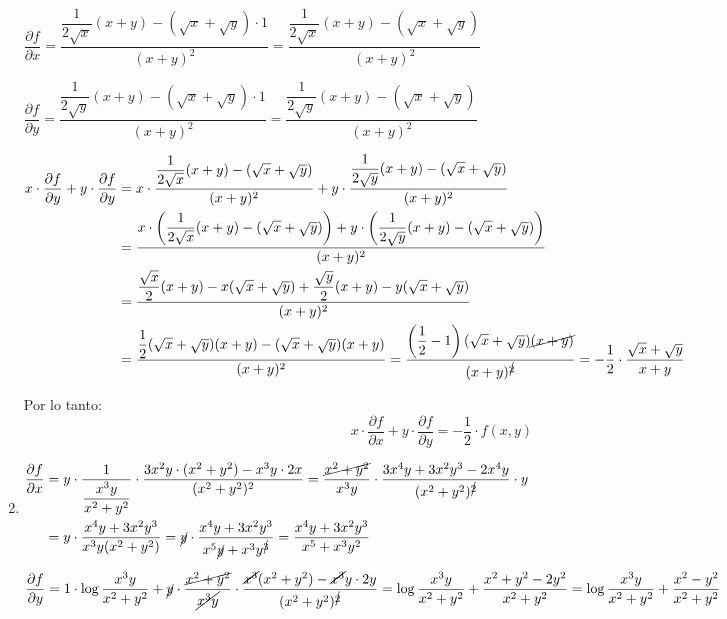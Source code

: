 \begin{enumerate}[label=\c olor{red}\textbf{\arabic*)}, leftmargin=*]
$\dfrac{\partial f}{\partial x}=\dfrac{\dfrac{1}{2\sqrt{x}}(x+y)-(\sqrt{x}+\sqrt{y})\cdot1}{(x+y)^{2}}=\dfrac{\dfrac{1}{2\sqrt{x}}(x+y)-(\sqrt{x}+\sqrt{y})}{(x+y)^{2}}$

$\dfrac{\partial f}{\partial y}=\dfrac{\dfrac{1}{2\sqrt{y}}(x+y)-(\sqrt{x}+\sqrt{y})\cdot1}{(x+y)^{2}}=\dfrac{\dfrac{1}{2\sqrt{y}}(x+y)-(\sqrt{x}+\sqrt{y})}{(x+y)^{2}}$

$\begin{aligned}
x\cdot\dfrac{\partial f}{\partial y}+y\cdot\dfrac{\partial f}{\partial y}&=x\cdot\dfrac{\dfrac{1}{2\sqrt{x}}(x+y)-(\sqrt{x}+\sqrt{y})}{(x+y)^{2}}+y\cdot\dfrac{\dfrac{1}{2\sqrt{y}}(x+y)-(\sqrt{x}+\sqrt{y})}{(x+y)^{2}}\\
&=\dfrac{x\cdot\left(\dfrac{1}{2\sqrt{x}}(x+y)-(\sqrt{x}+\sqrt{y})\right)+y\cdot\left(\dfrac{1}{2\sqrt{y}}(x+y)-(\sqrt{x}+\sqrt{y})\right)}{(x+y)^{2}}\\
& =\dfrac{\dfrac{\sqrt{x}}{2}(x+y)-x(\sqrt{x}+\sqrt{y})+\dfrac{\sqrt{y}}{2}(x+y)-y(\sqrt{x}+\sqrt{y})}{(x+y)^2}\\
&=\dfrac{\dfrac{1}{2}(\sqrt{x}+\sqrt{y})(x+y)-(\sqrt{x}+\sqrt{y})(x+y)}{(x+y)^{2}}=\dfrac{\left(\dfrac{1}{2}-1\right)(\sqrt{x}+\sqrt{y})\cancel{(x+y)}}{(x+y)^{\cancel{2}}}=-\dfrac{1}{2}\cdot\dfrac{\sqrt{x}+\sqrt{y}}{x+y}
\end{aligned}$

Por lo tanto: \[ x\cdot\dfrac{\partial f}{\partial x}+y\cdot\dfrac{\partial f}{\partial y}=-\dfrac{1}{2}\cdot f(x,y) \]

\item {}

$\begin{aligned}
\dfrac{\partial f}{\partial x}&=y\cdot\dfrac{1}{\dfrac{x^{3}y}{x^{2}+y^{2}}}\cdot\dfrac{3x^{2}y\cdot(x^{2}+y^{2})-x^{3}y\cdot2x}{(x^{2}+y^{2})^{2}}=\dfrac{\cancel{x^{2}+y^{2}}}{x^{3}y}\cdot\dfrac{3x^{4}y+3x^{2}y^{3}-2x^{4}y}{(x^{2}+y^{2})^{\cancel{2}}}\cdot y\\
&=y\cdot\dfrac{x^{4}y+3x^{2}y^{3}}{x^{3}y(x^{2}+y^{2})}=\cancel{y}\cdot\dfrac{x^{4}y+3x^{2}y^{3}}{x^{5}\cancel{y}+x^{3}y^{\cancel{3}}}=\dfrac{x^{4}y+3x^{2}y^{3}}{x^{5}+x^{3}y^{2}}
\end{aligned}$

$\dfrac{\partial f}{\partial y}=1\cdot\log\dfrac{x^{3}y}{x^{2}+y^{2}}+\cancel{y}\cdot\dfrac{\cancel{x^{2}+y^{2}}}{\cancel{x^{3}y}}\cdot\dfrac{\cancel{x^{3}}(x^{2}+y^{2})-\cancel{x^{3}}y\cdot2y}{(x^{2}+y^{2})^{\cancel{2}}}=\log\dfrac{x^{3}y}{x^{2}+y^{2}}+\dfrac{x^{2}+y^{2}-2y^{2}}{x^{2}+y^{2}}=\log\dfrac{x^{3}y}{x^{2}+y^{2}}+\dfrac{x^{2}-y^{2}}{x^{2}+y^{2}}$


\end{enumerate}
